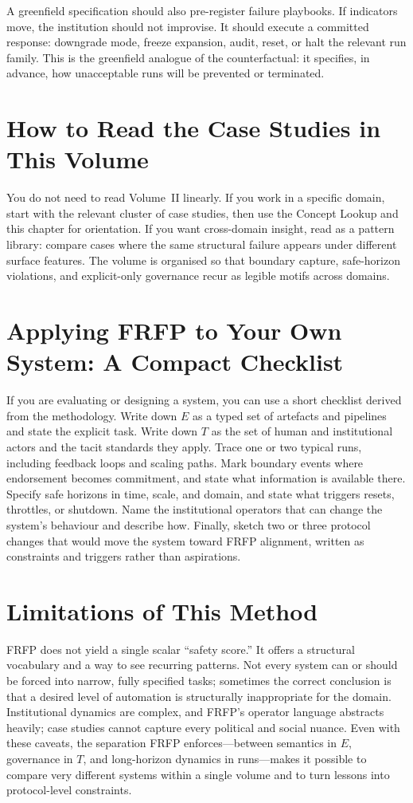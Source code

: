A greenfield specification should also pre-register failure playbooks. If indicators move, the institution should not improvise. It should execute a committed response: downgrade mode, freeze expansion, audit, reset, or halt the relevant run family. This is the greenfield analogue of the counterfactual: it specifies, in advance, how unacceptable runs will be prevented or terminated.

\section{How to Read the Case Studies in This Volume}

You do not need to read Volume~II linearly. If you work in a specific domain, start with the relevant cluster of case studies, then use the Concept Lookup and this chapter for orientation. If you want cross-domain insight, read as a pattern library: compare cases where the same structural failure appears under different surface features. The volume is organised so that boundary capture, safe-horizon violations, and explicit-only governance recur as legible motifs across domains.

\section{Applying FRFP to Your Own System: A Compact Checklist}

If you are evaluating or designing a system, you can use a short checklist derived from the methodology. Write down \(E\) as a typed set of artefacts and pipelines and state the explicit task. Write down \(T\) as the set of human and institutional actors and the tacit standards they apply. Trace one or two typical runs, including feedback loops and scaling paths. Mark boundary events where endorsement becomes commitment, and state what information is available there. Specify safe horizons in time, scale, and domain, and state what triggers resets, throttles, or shutdown. Name the institutional operators that can change the system’s behaviour and describe how. Finally, sketch two or three protocol changes that would move the system toward FRFP alignment, written as constraints and triggers rather than aspirations.

\section{Limitations of This Method}

FRFP does not yield a single scalar ``safety score.'' It offers a structural vocabulary and a way to see recurring patterns. Not every system can or should be forced into narrow, fully specified tasks; sometimes the correct conclusion is that a desired level of automation is structurally inappropriate for the domain. Institutional dynamics are complex, and FRFP’s operator language abstracts heavily; case studies cannot capture every political and social nuance. Even with these caveats, the separation FRFP enforces---between semantics in \(E\), governance in \(T\), and long-horizon dynamics in runs---makes it possible to compare very different systems within a single volume and to turn lessons into protocol-level constraints.


